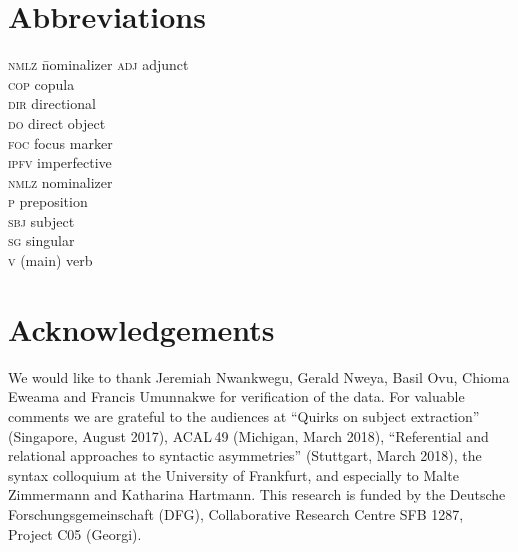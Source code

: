 \documentclass[output=paper,colorlinks,citecolor=brown]{langscibook}
\begin{document}
\section*{Abbreviations}
\begin{multicols}{3}
\begin{tabbing}
  \textsc{nmlz} \hspace{1ex}  \= nominalizer\kill
  \textsc{adj}    \> adjunct\\
  \textsc{cop}    \> copula\\
  \textsc{dir}    \> directional\\
  \textsc{do}     \> direct object\\
  \textsc{foc}    \> focus marker\\
  \textsc{ipfv}   \> imperfective\\
  \textsc{nmlz}   \> nominalizer\\
  \textsc{p}      \> preposition\\
  \textsc{sbj}    \> subject\\
  \textsc{sg}     \> singular\\
  \textsc{v}      \> (main) verb
\end{tabbing}
\end{multicols}

\section*{Acknowledgements}
We would like to thank Jeremiah Nwankwegu, Gerald Nweya, Basil Ovu, Chioma Eweama and Francis Umunnakwe for verification of the  data. For valuable comments we are grateful to the audiences at ``Quirks on subject extraction'' (Singapore, August 2017), ACAL\,49 (Michigan, March 2018), ``Referential and relational approaches to syntactic asymmetries'' (Stuttgart, March 2018), the syntax colloquium at the University of Frankfurt, and especially to Malte Zimmermann and Katharina Hartmann. This research is funded by the Deutsche Forschungsgemeinschaft (DFG), Collaborative Research Centre SFB 1287, Project C05 (Georgi).

\printbibliography[heading=subbibliography,notkeyword=this]
\end{document}
